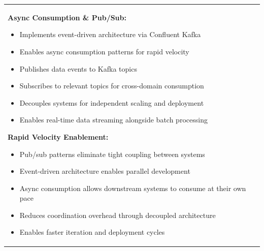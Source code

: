 \documentclass[10pt, a4paper]{article}
\begin{document}
{\begin{tabular}[t]{@{}p{}@{\hspace{0.02\textwidth}}p{}@{}}
\vspace{0.1em}

\textbf{Async Consumption \& Pub/Sub:}
\begin{itemize}[leftmargin=1em, itemsep=0.05em]
    \item Implements event-driven architecture via Confluent Kafka
    \item Enables async consumption patterns for rapid velocity
    \item Publishes data events to Kafka topics
    \item Subscribes to relevant topics for cross-domain consumption
    \item Decouples systems for independent scaling and deployment
    \item Enables real-time data streaming alongside batch processing
\end{itemize}

\vspace{0.1em}

\textbf{Rapid Velocity Enablement:}
\begin{itemize}[leftmargin=1em, itemsep=0.05em]
    \item Pub/sub patterns eliminate tight coupling between systems
    \item Event-driven architecture enables parallel development
    \item Async consumption allows downstream systems to consume at their own pace
    \item Reduces coordination overhead through decoupled architecture
    \item Enables faster iteration and deployment cycles
\end{itemize}

\end{tabular}
}

\vspace{0.3em}
\end{document}

